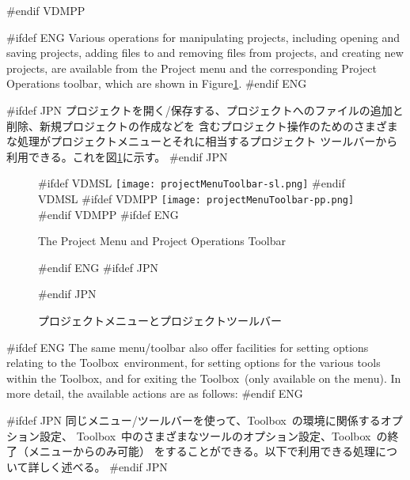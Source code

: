 \documentclass[\pformat,12pt]{article}
\newcommand{\Toolbox}{Toolbox}
\newcommand{\Toolbox}{Toolbox}
\newcommand{\guicmd}[1]{{\sf #1}}
\newcommand{\guicmd}[1]{{\gt #1}}
\begin{document}
#endif VDMPP

#ifdef ENG
Various operations for manipulating projects, including opening and
saving projects, adding files to and removing files from projects, and
creating new projects, are available from the \guicmd{Project}
menu and the corresponding \guicmd{Project
  Operations} toolbar, which are
shown in Figure\ref{fig:projectMenuToolbar}.
#endif ENG

#ifdef JPN
プロジェクトを開く/保存する、プロジェクトへのファイルの追加と削除、新規プロジェクトの作成などを
含むプロジェクト操作のためのさまざまな処理が\guicmd{プロジェクト}メニューとそれに相当する\guicmd{プロジェクト}
ツールバーから利用できる。これを図\ref{fig:projectMenuToolbar}に示す。
#endif JPN

\begin{figure}[tbh]
\begin{center}
\mbox{}
#ifdef VDMSL
\texttt{[image: projectMenuToolbar-sl.png]}
#endif VDMSL
#ifdef VDMPP
\texttt{[image: projectMenuToolbar-pp.png]}
#endif VDMPP
#ifdef ENG
\caption{The Project Menu and Project Operations Toolbar}
#endif ENG
#ifdef JPN
\caption{プロジェクトメニューとプロジェクトツールバー}
#endif JPN
\label{fig:projectMenuToolbar}
\end{center}
\end{figure}

#ifdef ENG
The same menu/toolbar also offer facilities for setting options
relating to the \Toolbox\ environment, for setting options for the
various tools within the \Toolbox, and for exiting the \Toolbox\
(only available on the menu). In more  detail, the available actions
are as follows:
#endif ENG

#ifdef JPN
同じメニュー/ツールバーを使って、\Toolbox\ の環境に関係するオプション設定、
\Toolbox\ 中のさまざまなツールのオプション設定、\Toolbox\ の終了（メニューからのみ可能）
をすることができる。以下で利用できる処理について詳しく述べる。
#endif JPN
\end{document}
